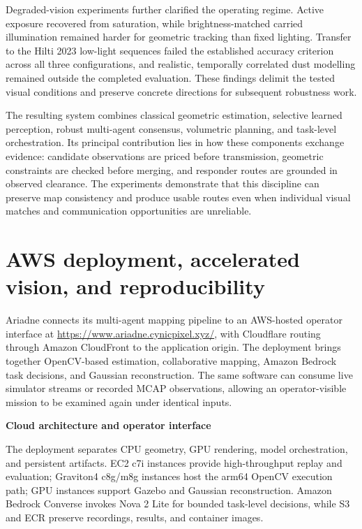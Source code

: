 \documentclass[10pt,a4paper]{article}
\newcommand{\indentedheading}[1]{\par\addvspace{0.65em}\noindent\hspace*{1em}\textbf{#1}\par\smallskip}
\begin{document}
Degraded-vision experiments further clarified the operating
regime. Active exposure recovered from saturation, while
brightness-matched carried illumination remained harder for
geometric tracking than fixed lighting. Transfer to the
Hilti 2023 low-light sequences failed the established accuracy
criterion across all three configurations, and realistic,
temporally correlated dust modelling remained outside the
completed evaluation. These findings delimit the tested
visual conditions and preserve concrete directions for
subsequent robustness work.

The resulting system combines classical geometric estimation,
selective learned perception, robust multi-agent consensus,
volumetric planning, and task-level orchestration. Its principal
contribution lies in how these components exchange evidence:
candidate observations are priced before transmission, geometric
constraints are checked before merging, and responder routes
are grounded in observed clearance. The experiments demonstrate
that this discipline can preserve map consistency and produce
usable routes even when individual visual matches and
communication opportunities are unreliable.



\section{AWS deployment, accelerated vision, and reproducibility}

Ariadne connects its multi-agent mapping pipeline to an AWS-hosted
operator interface at \url{https://www.ariadne.cynicpixel.xyz/},
with Cloudflare routing through Amazon CloudFront to the application
origin. The deployment brings together OpenCV-based estimation,
collaborative mapping, Amazon Bedrock task decisions, and Gaussian
reconstruction. The same software can consume live simulator streams
or recorded MCAP observations, allowing an operator-visible mission
to be examined again under identical inputs.

\indentedheading{Cloud architecture and operator interface}

The deployment separates CPU geometry, GPU rendering, model
orchestration, and persistent artifacts. EC2 c7i instances provide
high-throughput replay and evaluation; Graviton4 c8g/m8g instances
host the arm64 OpenCV execution path; GPU instances support Gazebo
and Gaussian reconstruction. Amazon Bedrock Converse invokes Nova
2 Lite for bounded task-level decisions, while S3 and ECR preserve
recordings, results, and container images.
\end{document}

